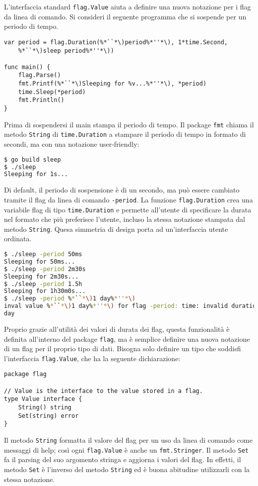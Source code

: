 %
L'interfaccia standard \verb|flag.Value| aiuta a definire una nuova notazione per i flag da linea di comando.
Si consideri il seguente programma che si sospende per un periodo di tempo.
\begin{lstlisting}[frame=single, label={lst:lstlisting6-4.1}]
var period = flag.Duration(%*``*\)period%*''*\), 1*time.Second,
    %*``*\)sleep period%*''*\))

func main() {
    flag.Parse()
    fmt.Printf(%*``*\)Sleeping for %v...%*''*\), *period)
    time.Sleep(*period)
    fmt.Println()
}
\end{lstlisting}
Prima di sospendersi il main stampa il periodo di tempo.
Il package \verb|fmt| chiama il metodo \verb|String| di \verb|time.Duration| a stampare il periodo di tempo in formato di secondi, ma con una notazione user-friendly:
\begin{lstlisting}[language=bash, frame=L, label={lst:lstlisting6-4.2}]
$ go build sleep
$ ./sleep
Sleeping for 1s...
\end{lstlisting}
Di default, il periodo di sospensione è di un secondo, ma può essere cambiato tramite il flag da linea di comando \verb|-period|.
La funzione \verb|flag.Duration| crea una variabile flag di tipo \verb|time.Duration| e permette all'utente di specificare la durata nel formato che più preferisce l'utente, incluso la stessa notazione stampata dal metodo \verb|String|.
Quesa simmetria di design porta ad un'interfaccia utente ordinata.
\begin{lstlisting}[language=bash, frame=L, label={lst:lstlisting6-4.3}]
$ ./sleep -period 50ms
Sleeping for 50ms...
$ ./sleep -period 2m30s
Sleeping for 2m30s...
$ ./sleep -period 1.5h
Sleeping for 1h30m0s...
$ ./sleep -period %*``*\)1 day%*''*\)
inval value %*``*\)1 day%*''*\) for flag -period: time: invalid duration 1
day
\end{lstlisting}
Proprio grazie all'utilità dei valori di durata dei flag, questa funzionalità è definita all'interno del package \verb|flag|, ma è semplice definire una nuova notazione di un flag per il proprio tipo di dati.
Bisogna solo definire un tipo che soddisfi l'interfaccia \verb|flag.Value|, che ha la seguente dichiarazione:
\begin{lstlisting}[frame=single, label={lst:lstlisting6-4.4}]
package flag

// Value is the interface to the value stored in a flag.
type Value interface {
    String() string
    Set(string) error
}
\end{lstlisting}
Il metodo \verb|String| formatta il valore del flag per un uso da linea di comando come messaggi di help;
così ogni \verb|flag.Value| è anche un \verb|fmt.Stringer|.
Il metodo \verb|Set| fa il parsing del suo argomento stringa e aggiorna i valori del flag.
In effetti, il metodo \verb|Set| è l'inverso del metodo \verb|String| ed è buona abitudine utilizzarli con la stessa notazione.

